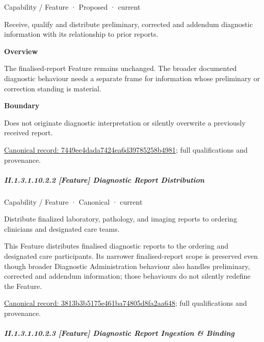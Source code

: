 \label{element:7449ee4dada7424ea6d39785258b4981}
{\small Capability / Feature · Proposed · current}\par

Receive, qualify and distribute preliminary, corrected and addendum diagnostic information with its relationship to prior reports.



\textbf{Overview}



The finalised-report Feature remains unchanged. The broader documented diagnostic behaviour needs a separate frame for information whose preliminary or correction standing is material.



\textbf{Boundary}



Does not originate diagnostic interpretation or silently overwrite a previously received report.


{\footnotesize \href{../../../../continuum/strategy/capability/feature/7449ee4dada7424ea6d39785258b4981.md}{Canonical record: 7449ee4dada7424ea6d39785258b4981}; full qualifications and provenance.}\par
\subparagraph*{II.1.3.1.10.2.2 [Feature] Diagnostic Report Distribution}
\label{navigation:II.1.3.1.10.2.2}

\label{element:3813b3b5175e461ba74805d8fa2aa648}
{\small Capability / Feature · Canonical · current}\par

Distribute finalized laboratory, pathology, and imaging reports to ordering clinicians and designated care teams.



This Feature distributes finalised diagnostic reports to the ordering and designated care participants. Its narrower finalised-report scope is preserved even though broader Diagnostic Administration behaviour also handles preliminary, corrected and addendum information; those behaviours do not silently redefine the Feature.


{\footnotesize \href{../../../../continuum/strategy/capability/feature/3813b3b5175e461ba74805d8fa2aa648.md}{Canonical record: 3813b3b5175e461ba74805d8fa2aa648}; full qualifications and provenance.}\par
\subparagraph*{II.1.3.1.10.2.3 [Feature] Diagnostic Report Ingestion \& Binding}
\label{navigation:II.1.3.1.10.2.3}

